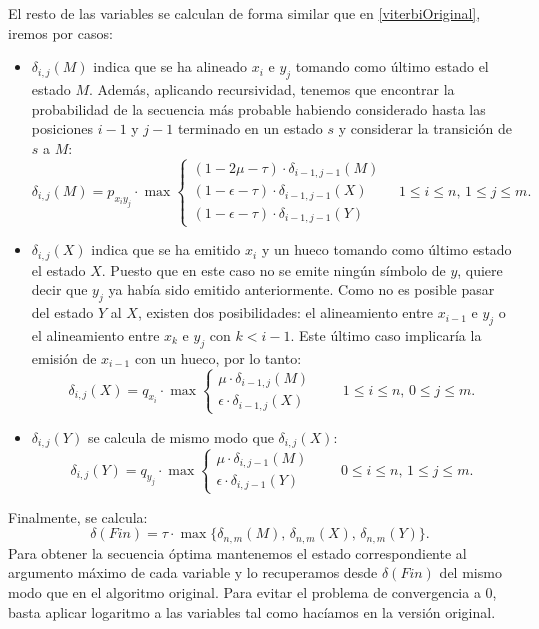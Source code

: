 El resto de las variables se calculan de forma similar que en \eqref{viterbiOriginal}, iremos por casos:
\begin{itemize}
    \item $\delta_{i,j}(M)$ indica que se ha alineado $x_i$ e $y_j$ tomando como último estado el estado $M$. Además, aplicando recursividad, tenemos que encontrar la probabilidad de la secuencia más probable habiendo considerado hasta las posiciones $i-1$ y $j-1$ terminado en un estado $s$ y considerar la transición de $s$ a $M$:
    \[\delta_{i,j}(M)=p_{x_iy_j}\cdot \max
    \begin{cases}
        (1-2\mu-\tau)\cdot\delta_{i-1,j-1}(M) \\
        (1-\epsilon-\tau)\cdot\delta_{i-1,j-1}(X) \\
        (1-\epsilon-\tau)\cdot\delta_{i-1,j-1}(Y)
    \end{cases} \quad 1\leq i\leq n, \, 1\leq j \leq m.\] 

    \item $\delta_{i,j}(X)$ indica que se ha emitido $x_i$ y un hueco tomando como último estado el estado $X$. Puesto que en este caso no se emite ningún símbolo de $y$, quiere decir que $y_j$ ya había sido emitido anteriormente. Como no es posible pasar del estado $Y$ al $X$, existen dos posibilidades: el alineamiento entre $x_{i-1}$ e $y_j$ o el alineamiento entre $x_k$ e $y_j$ con $k<i-1$. Este último caso implicaría la emisión de $x_{i-1}$ con un hueco, por lo tanto:
    \[\delta_{i,j}(X)=q_{x_i}\cdot \max 
    \begin{cases}
        \mu\cdot\delta_{i-1,j}(M) \\
        \epsilon\cdot\delta_{i-1,j}(X) 
    \end{cases} \qquad 1\leq i\leq n, \, 0\leq j \leq m.\]

    \item $\delta_{i,j}(Y)$ se calcula de mismo modo que $\delta_{i,j}(X)$:
    \[\delta_{i,j}(Y)=q_{y_j}\cdot \max 
    \begin{cases}
        \mu\cdot\delta_{i,j-1}(M) \\
        \epsilon\cdot\delta_{i,j-1}(Y) 
    \end{cases} \qquad 0\leq i\leq n, \, 1\leq j \leq m.\]
\end{itemize}
Finalmente, se calcula:
\[\delta(Fin)=\tau\cdot\max\{\delta_{n,m}(M),\,\delta_{n,m}(X),\,\delta_{n,m}(Y)\}.\]
Para obtener la secuencia óptima mantenemos el estado correspondiente al argumento máximo de cada variable y lo recuperamos desde $\delta(Fin)$ del mismo modo que en el algoritmo original. Para evitar el problema de convergencia a $0$, basta aplicar logaritmo a las variables tal como hacíamos en la versión original.

